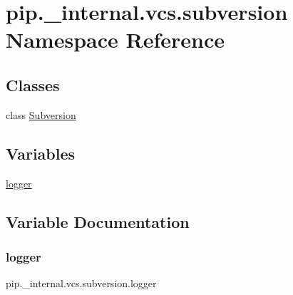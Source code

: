 \hypertarget{namespacepip_1_1__internal_1_1vcs_1_1subversion}{}\section{pip.\+\_\+internal.\+vcs.\+subversion Namespace Reference}
\label{namespacepip_1_1__internal_1_1vcs_1_1subversion}
\subsection*{Classes}
\begin{DoxyCompactItemize}
\item 
class \hyperlink{classpip_1_1__internal_1_1vcs_1_1subversion_1_1Subversion}{Subversion}
\end{DoxyCompactItemize}
\subsection*{Variables}
\begin{DoxyCompactItemize}
\item 
\hyperlink{namespacepip_1_1__internal_1_1vcs_1_1subversion_ab8f4e9195ead1eedf8deb829d7ccc67d}{logger}
\end{DoxyCompactItemize}


\subsection{Variable Documentation}
\mbox{\label{namespacepip_1_1__internal_1_1vcs_1_1subversion_ab8f4e9195ead1eedf8deb829d7ccc67d}} 
\subsubsection{\texorpdfstring{logger}{logger}}
{\footnotesize\ttfamily pip.\+\_\+internal.\+vcs.\+subversion.\+logger}

